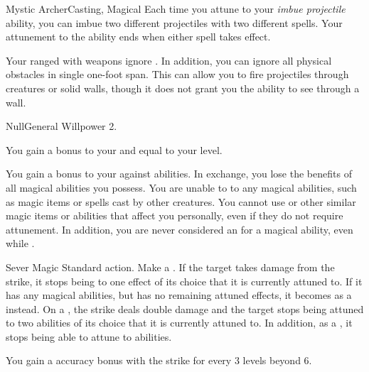 \begin{magicalfeat}{Mystic Archer}{Casting, Magical}
     Each time you attune to your \textit{imbue projectile} ability, you can imbue two different projectiles with two different spells.
    Your attunement to the ability ends when either spell takes effect.

     Your ranged  with  weapons ignore .
    In addition, you can ignore all physical obstacles in single one-foot span.
    This can allow you to fire projectiles through creatures or solid walls, though it does not grant you the ability to see through a wall.
  \end{magicalfeat}

  \begin{feat}{Null}{General}
    \featpre Willpower 2.

     You gain a bonus to your  and  equal to your level.

     You gain a  bonus to your  against \magical abilities.
    In exchange, you lose the benefits of all magical abilities you possess.
    You are unable to  to any magical abilities, such as magic items or spells cast by other creatures.
    You cannot use  or other similar magic items or abilities that affect you personally, even if they do not require attunement.
    In addition, you are never considered an  for a magical ability, even while \unconscious.

    \begin{activeability}{Sever Magic}
      \abilityusagetime Standard action.
      \rankline
      Make a .
      If the target takes damage from the strike, it stops being  to one effect of its choice that it is currently attuned to.
      If it has any magical abilities, but has no remaining attuned effects, it becomes \stunned as a  instead.
      On a , the strike deals double damage and the target stops being attuned to two abilities of its choice that it is currently attuned to.
      In addition, as a , it stops being able to attune to abilities.

      \rankline
      You gain a  accuracy bonus with the strike for every 3 levels beyond 6.
    \end{activeability}


\end{feat}
